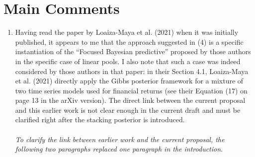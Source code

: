 \documentclass[ba]{imsart}
\newcommand{\1}[1]{\mathds{1}\left[#1\right]}
\begin{document}
\section{Main Comments}
\begin{enumerate}[(1)]
  \item Having read the paper by Loaiza-Maya et al. (2021) when it was 
  initially published, it
appears to me that the approach suggested in (4) is a specific instantiation 
of the “Focused
Bayesian predictive” proposed by those authors in the specific case of linear 
pools. I also note
that such a case was indeed considered by those authors in that paper: in 
their Section 4.1,
Loaiza-Maya et al. (2021) directly apply the Gibbs posterior framework for a 
mixture of two
time series models used for financial returns (see their Equation (17) on page 
13 in the arXiv
version). The direct link between the current proposal and this earlier work 
is not clear enough
in the current draft and must be clarified right after the stacking posterior 
is introduced.
\\~\\
\emph{To clarify the link between earlier work and the current proposal, 
the following two paragraphs replaced one paragraph in the introduction}.


\end{enumerate}
\end{document}
